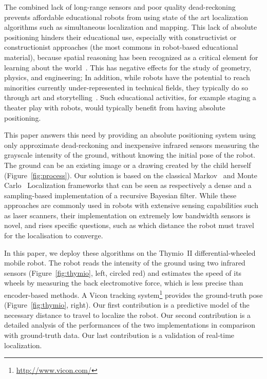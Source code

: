 \documentclass[letterpaper, 10pt, conference]{ieeeconf}
\newcommand{\fig}[1]{Figure~\ref{fig:#1}}
\begin{document}
The combined lack of long-range sensors and poor quality dead-reckoning prevents affordable educational robots from using state of the art localization algorithms such as simultaneous localization and mapping.
This lack of absolute positioning hinders their educational use, especially with constructivist or constructionist approaches (the most commons in robot-based educational material), because spatial reasoning has been recognized as a critical element for learning about the world~\cite{lesh2003beyond}.
This has negative effects for the study of geometry, physics, and engineering;
In addition, while robots have the potential to reach minorities currently under-represented in technical fields, they typically do so through art and storytelling~\cite{szecsei2015girls}.
Such educational activities, for example staging a theater play with robots, would typically benefit from having absolute positioning.

This paper answers this need by providing an absolute positioning system using only approximate dead-reckoning and inexpensive infrared sensors measuring the grayscale intensity of the ground, without knowing the initial pose of the robot.
The ground can be an existing image or a drawing created by the child herself (\fig{process}).
Our solution is based on the classical Markov~\cite{fox1999markov} and Monte Carlo~\cite{dellaert1999monte} Localization frameworks that can be seen as respectively a dense and a sampling-based implementation of a recursive Bayesian filter.
While these approaches are commonly used in robots with extensive sensing capabilities such as laser scanners, their implementation on extremely low bandwidth sensors is novel, and rises specific questions, such as which distance the robot must travel for the localisation to converge.

In this paper, we deploy these algorithms on the Thymio~II differential-wheeled mobile robot.
The robot reads the intensity of the ground using two infrared sensors (\fig{thymio}, left, circled red) and estimates the speed of its wheels by measuring the back electromotive force, which is less precise than encoder-based methods.
A Vicon tracking system\footnote{\url{http://www.vicon.com/}} provides the ground-truth pose (\fig{thymio}, right).
Our first contribution is a predictive model of the necessary distance to travel to localize the robot.
Our second contribution is a detailed analysis of the performances of the two implementations in comparison with ground-truth data.
Our last contribution is a validation of real-time localization.
\end{document}
